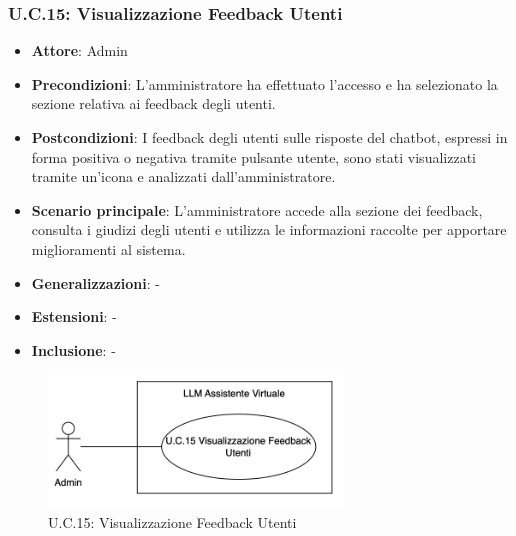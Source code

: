 \subsubsection{U.C.15: Visualizzazione Feedback Utenti}
\begin{itemize}
    \item \textbf{Attore}: Admin
    \item \textbf{Precondizioni}: L'amministratore ha effettuato l'accesso e ha selezionato la sezione relativa ai feedback degli utenti.
    \item \textbf{Postcondizioni}: I feedback degli utenti sulle risposte del chatbot, espressi in forma positiva o negativa tramite pulsante utente, sono stati visualizzati tramite un'icona e analizzati dall’amministratore.  
    \item \textbf{Scenario principale}: L'amministratore accede alla sezione dei feedback, consulta i giudizi degli utenti e utilizza le informazioni raccolte per apportare miglioramenti al sistema.
    \item \textbf{Generalizzazioni}: -
    \item \textbf{Estensioni}: -
    \item \textbf{Inclusione}: -
\end{itemize}
\begin{figure}[H]
    \centering
    \includegraphics[width=0.7\textwidth]{img/UC15.png}
    \caption{U.C.15: Visualizzazione Feedback Utenti}
\end{figure}
\newpage

